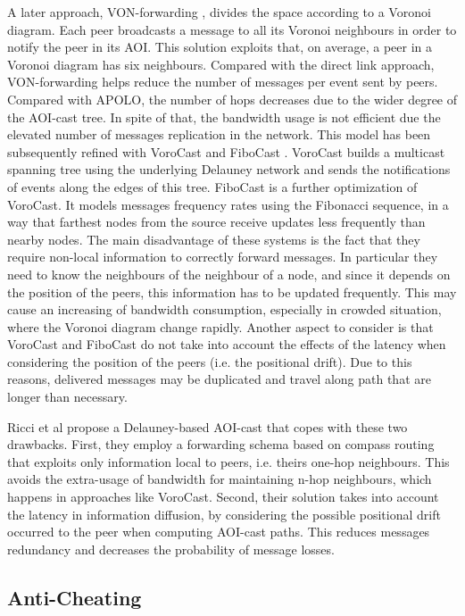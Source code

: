 \documentclass[final,10pt,a5paper]{phdimt}
\theoremstyle{definition}
\begin{document}
A later approach, VON-forwarding \cite{chen2007forwarding}, divides the space according to a Voronoi diagram.
Each peer broadcasts a message to all its Voronoi neighbours in order to notify the peer in its AOI. This solution exploits that, on average, a peer in a Voronoi diagram has six neighbours. Compared with the direct link approach, VON-forwarding helps reduce the number of messages per event sent by peers. 
Compared with APOLO, the number of hops decreases due to the wider degree of the AOI-cast tree.
In spite of that, the bandwidth usage is not efficient due the elevated number of messages replication in the network.
This model has been subsequently refined with VoroCast and FiboCast \cite{Jiang2009}.
VoroCast builds a multicast spanning tree using the underlying Delauney network and sends the notifications of events along the edges of this tree. FiboCast is a further optimization of VoroCast. It models messages frequency rates using the Fibonacci sequence, in a way that farthest nodes from the source receive updates less frequently than nearby nodes.
The main disadvantage of these systems is the fact that they require non-local information to correctly forward messages. 
In particular they need to know the neighbours of the neighbour of a node, and since it depends on the position of the peers, this information has to be updated frequently. This may cause an increasing of bandwidth consumption, especially in crowded situation, where the Voronoi diagram change rapidly. Another aspect to consider is that VoroCast and FiboCast do not take into account the effects of the latency when considering the position of the peers (i.e. the positional drift). Due to this reasons, delivered messages may be duplicated and travel along path that are longer than necessary.

Ricci et al \cite{ricci2011aoi} propose a Delauney-based AOI-cast that copes with these two drawbacks. First, they employ a forwarding schema based on compass routing that exploits only information local to peers, i.e. theirs one-hop neighbours. This avoids the extra-usage of bandwidth for maintaining n-hop neighbours, which happens in approaches like VoroCast. Second, their solution takes into account the latency in information diffusion, by considering the possible positional drift occurred to the peer when computing AOI-cast paths. This reduces messages redundancy and decreases the probability of message losses.


\subsection{Anti-Cheating}
\end{document}

